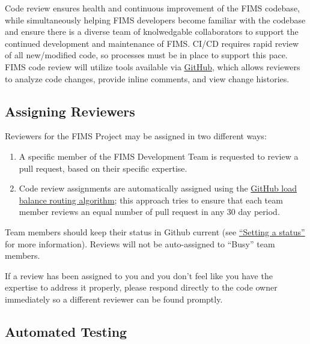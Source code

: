 \documentclass[
]{book}
\providecommand{\tightlist}{%
  \setlength{\itemsep}{0pt}\setlength{\parskip}{0pt}}
\begin{document}
Code review ensures health and continuous improvement of the FIMS codebase, while simultaneously helping FIMS developers become familiar with the codebase and ensure there is a diverse team of knolwedgable collaborators to support the continued development and maintenance of FIMS. CI/CD requires rapid review of all new/modified code, so processes must be in place to support this pace. FIMS code review will utilize tools available via \href{https://github.com/features/code-review}{GitHub}, which allows reviewers to analyze code changes, provide inline comments, and view change histories.

\hypertarget{assigning-reviewers}{%
\subsection{Assigning Reviewers}\label{assigning-reviewers}}

Reviewers for the FIMS Project may be assigned in two different ways:

\begin{enumerate}
\def\labelenumi{\arabic{enumi}.}
\tightlist
\item
  A specific member of the FIMS Development Team is requested to review a pull request, based on their specific expertise.
\item
  Code review assignments are automatically assigned using the \href{https://docs.github.com/en/organizations/organizing-members-into-teams/managing-code-review-settings-for-your-team}{GitHub load balance routing algorithm}; this approach tries to ensure that each team member reviews an equal number of pull request in any 30 day period.
\end{enumerate}

Team members should keep their status in Github current (see \href{https://docs.github.com/en/account-and-profile/setting-up-and-managing-your-github-profile/customizing-your-profile/personalizing-your-profile\#setting-a-status}{``Setting a status''} for more information). Reviews will not be auto-assigned to ``Busy'' team members.

If a review has been assigned to you and you don't feel like you have the expertise to address it properly, please respond directly to the code owner immediately so a different reviewer can be found promptly.

\hypertarget{automated-testing}{%
\subsection{Automated Testing}\label{automated-testing}}
\end{document}
